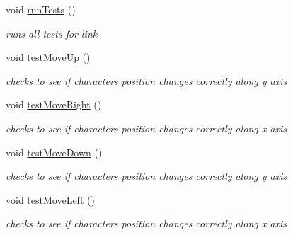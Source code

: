 \begin{DoxyCompactItemize}
\mbox{\label{classRose_1_1Character_1_1Link_ac2a390484679c8a05e297c6f86ef0b52}} 
void \mbox{\hyperlink{classRose_1_1Character_1_1Link_ac2a390484679c8a05e297c6f86ef0b52}{run\+Tests}} ()
\begin{DoxyCompactList}\small\item\em runs all tests for link \end{DoxyCompactList}\item 
\mbox{\label{classRose_1_1Character_1_1Link_a66810a37d6960a683aa5067c61d8ebfa}} 
void \mbox{\hyperlink{classRose_1_1Character_1_1Link_a66810a37d6960a683aa5067c61d8ebfa}{test\+Move\+Up}} ()
\begin{DoxyCompactList}\small\item\em checks to see if characters position changes correctly along y axis \end{DoxyCompactList}\item 
\mbox{\label{classRose_1_1Character_1_1Link_a88ff0feca5e7f088760274542a1766ad}} 
void \mbox{\hyperlink{classRose_1_1Character_1_1Link_a88ff0feca5e7f088760274542a1766ad}{test\+Move\+Right}} ()
\begin{DoxyCompactList}\small\item\em checks to see if characters position changes correctly along x axis \end{DoxyCompactList}\item 
\mbox{\label{classRose_1_1Character_1_1Link_a05c3ac6bb382f079f610fc12e0da62f0}} 
void \mbox{\hyperlink{classRose_1_1Character_1_1Link_a05c3ac6bb382f079f610fc12e0da62f0}{test\+Move\+Down}} ()
\begin{DoxyCompactList}\small\item\em checks to see if characters position changes correctly along y axis \end{DoxyCompactList}\item 
\mbox{\label{classRose_1_1Character_1_1Link_a3ae04dbd8d24b8dd932b26e7052a3879}} 
void \mbox{\hyperlink{classRose_1_1Character_1_1Link_a3ae04dbd8d24b8dd932b26e7052a3879}{test\+Move\+Left}} ()
\begin{DoxyCompactList}\small\item\em checks to see if characters position changes correctly along x axis \end{DoxyCompactList}\item 

\end{DoxyCompactItemize}
